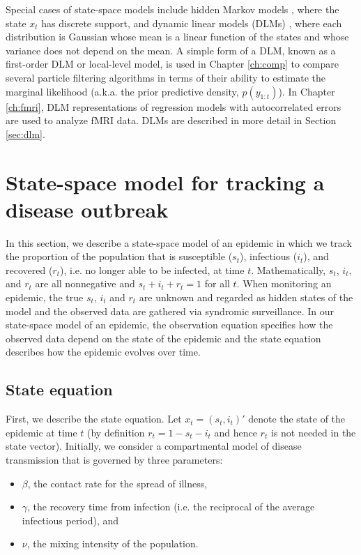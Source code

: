 Special cases of state-space models include hidden Markov models \citep{cappe:2005:inference}, where the state $x_t$ has discrete support, and dynamic linear models (DLMs) \citep{West:Harr:baye:1997, petris:camp:2009:dynamic}, where each distribution is Gaussian whose mean is a linear function of the states and whose variance does not depend on the mean. A simple form of a DLM, known as a first-order DLM or local-level model, is used in Chapter \ref{ch:comp} to compare several particle filtering algorithms in terms of their ability to estimate the marginal likelihood (a.k.a. the prior predictive density, $p(y_{1:t})$). In Chapter \ref{ch:fmri}, DLM representations of regression models with autocorrelated errors are used to analyze fMRI data. DLMs are described in more detail in Section \ref{sec:dlm}.

\section{State-space model for tracking a disease outbreak \label{sec:epid}}

In this section, we describe a state-space model of an epidemic in which we track the proportion of the population that is susceptible ($s_t$), infectious ($i_t$), and recovered ($r_t$), i.e. no longer able to be infected, at time $t$. Mathematically, $s_t$, $i_t$, and $r_t$ are all nonnegative and $s_t + i_t + r_t = 1$ for all $t$. When monitoring an epidemic, the true $s_t$, $i_t$ and $r_t$ are unknown and regarded as hidden states of the model and the observed data are gathered via syndromic surveillance. In our state-space model of an epidemic, the observation equation specifies how the observed data depend on the state of the epidemic and the state equation describes how the epidemic evolves over time.

\subsection{State equation \label{sec:epid:state}}

First, we describe the state equation. Let $x_t = (s_t,i_t)'$ denote the state of the epidemic at time $t$ (by definition $r_t=1-s_t-i_t$ and hence $r_t$ is not needed in the state vector). Initially, we consider a compartmental model of disease transmission that is governed by three parameters:

\begin{itemize}
\item $\beta$, the contact rate for the spread of illness,
\item $\gamma$, the recovery time from infection (i.e. the reciprocal of the average infectious period), and
\item $\nu$, the mixing intensity of the population.
\end{itemize}

